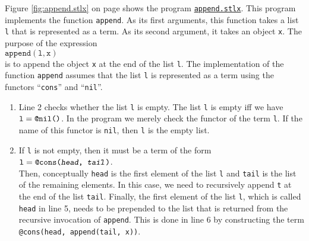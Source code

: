 Figure \ref{fig:append.stlx} on page \pageref{fig:append.stlx} shows the
program \href{https://github.com/karlstroetmann/Logik/blob/master/SetlX/append.stlx}{\texttt{append.stlx}}.
This program implements the function \texttt{append}.  As its first arguments, this function takes a list \texttt{l}
that is represented as a term.  As its second argument,  it takes an object \texttt{x}.  The purpose of the expression
\\[0.2cm]
\hspace*{1.3cm}
$\texttt{append}(\texttt{l}, \texttt{x})$
\\[0.2cm]
is to append the object \texttt{x} at the end of the list \texttt{l}.  The implementation of the function \texttt{append}
assumes that the list \texttt{l} is represented as a term using the functors ``\texttt{cons}'' and ``\texttt{nil}''.
\begin{enumerate}
\item Line 2 checks whether the list  \texttt{l} is empty. The list \texttt{l} is empty iff we have
      $\texttt{l} = \texttt{\at nil()}$.  In the program we merely check the functor of the term \texttt{l}.  If the name of this functor is
      \texttt{nil}, then \texttt{l} is the empty list.
\item If \texttt{l} is not empty, then it must be a term of the form
      \\[0.2cm]
      \hspace*{1.3cm}
      $\texttt{l} = \texttt{\at cons(\textsl{head}, \textsl{tail})}$.
      \\[0.2cm]     
      Then, conceptually \texttt{head} is the first element of the list \texttt{l} and \texttt{tail} is the list of
      the remaining elements.  In this case, we need to recursively append \texttt{t} at the end of the list \texttt{tail}.
      Finally, the first element of the list \texttt{l}, which is called \texttt{head} in line 5, needs
      to be prepended to the list that is returned from the recursive invocation of \texttt{append}.
      This is done in line 6 by constructing the term 
      \\[0.2cm]
      \hspace*{1.3cm}
      \texttt{@cons(head, append(tail, x))}.
\end{enumerate}

